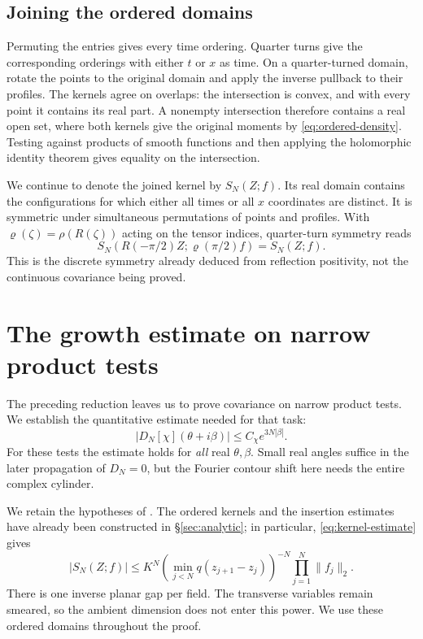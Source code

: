 \documentclass[11pt, letterpaper, reqno]{amsart}
\theoremstyle{definition}
\theoremstyle{remark}
\begin{document}
\subsection{Joining the ordered domains}\label{subsec:joining}

Permuting the entries gives every time ordering. Quarter turns give
the corresponding orderings with either $t$ or $x$ as time. On a
quarter-turned domain, rotate the points to the original domain and
apply the inverse pullback to their profiles. The kernels agree on
overlaps: the intersection is convex, and with every point it contains
its real part. A nonempty intersection therefore contains a real open
set, where both kernels give the original moments by
\eqref{eq:ordered-density}. Testing against products of smooth
functions and then applying the holomorphic identity theorem gives
equality on the intersection.

We continue to denote the joined kernel by $S_N(Z;f)$. Its real domain
contains the configurations for which either all times or all $x$
coordinates are distinct. It is symmetric under simultaneous
permutations of points and profiles. With
$\varrho(\zeta)=\rho(R(\zeta))$ acting on the tensor indices,
quarter-turn symmetry reads
\begin{equation}\label{eq:kernel-quarter}
 S_N(R(-\pi/2)Z;\varrho(\pi/2)f)=S_N(Z;f).
\end{equation}
This is the discrete symmetry already deduced from reflection
positivity, not the continuous covariance being proved.


\section{The growth estimate on narrow product tests}\label{sec:growth}

The preceding reduction leaves us to prove covariance on narrow product
tests. We establish the quantitative estimate needed for that task:
\[
 |D_N[\chi](\theta+i\beta)|\le C_\chi e^{3N|\beta|}.
\]
For these tests the estimate holds for \emph{all} real $\theta,\beta$.
Small real angles suffice in the later propagation of $D_N=0$, but
the Fourier contour shift here needs the entire complex cylinder.

We retain the hypotheses of . The ordered kernels and
the insertion estimates have already been constructed in
\S\ref{sec:analytic}; in particular, \eqref{eq:kernel-estimate} gives
\[
 |S_N(Z;f)|\le K^N
 \left(\min_{j<N}q(z_{j+1}-z_j)\right)^{-N}
 \prod_{j=1}^N\|f_j\|_2.
\]
There is one inverse planar gap per field. The transverse variables
remain smeared, so the ambient dimension does not enter this power.
We use these ordered domains throughout the proof.
\end{document}
